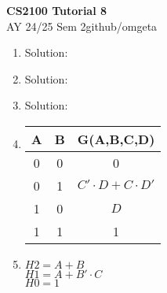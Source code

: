 \documentclass[12pt, a4paper]{article}
\newcommand{\mytitle}{CS2100 Tutorial 8}
\newcommand{\myauthor}{github/omgeta}
\newcommand{\mydate}{AY 24/25 Sem 2}
\begin{document}
\raggedright
\footnotesize
\begin{center}
{\normalsize{\textbf{\mytitle}}} \\
{\footnotesize{\mydate\hspace{2pt}\textemdash\hspace{2pt}\myauthor}}
\end{center}
\begin{enumerate}[Q\arabic*.]
  \item Solution:\\

  \item Solution:\\

  \item Solution:\\
  
  \item \begin{tabular}{|c|c|c|}
    \hline
    \textbf{A} & \textbf{B} & \textbf{G(A,B,C,D)} \\
    \hline
    0 & 0 & 0 \\
    \hline
    0 & 1 & $C'\cdot D + C \cdot D'$ \\
    \hline
    1 & 0 & $D$ \\
    \hline
    1 & 1 & 1 \\
    \hline
  \end{tabular} 

  \item $H2 = A + B$\\
    $H1 = A + B'\cdot C$\\
    $H0 = 1$
\end{enumerate}
\end{document}
